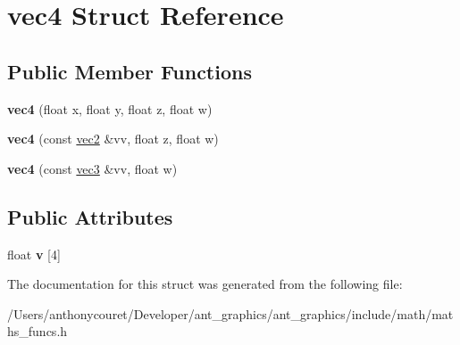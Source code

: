 \hypertarget{structvec4}{\section{vec4 Struct Reference}
\label{structvec4}
}
\subsection*{Public Member Functions}
\begin{DoxyCompactItemize}
\item 
\hypertarget{structvec4_a4174b718621ba5b473ea2c289f11fe46}{{\bfseries vec4} (float x, float y, float z, float w)}\label{structvec4_a4174b718621ba5b473ea2c289f11fe46}

\item 
\hypertarget{structvec4_ab203f1386ef0b79671e9a1324ceee484}{{\bfseries vec4} (const \hyperlink{structvec2}{vec2} \&vv, float z, float w)}\label{structvec4_ab203f1386ef0b79671e9a1324ceee484}

\item 
\hypertarget{structvec4_a8ba17db652f62b23a98cd481390f35da}{{\bfseries vec4} (const \hyperlink{structvec3}{vec3} \&vv, float w)}\label{structvec4_a8ba17db652f62b23a98cd481390f35da}

\end{DoxyCompactItemize}
\subsection*{Public Attributes}
\begin{DoxyCompactItemize}
\item 
\hypertarget{structvec4_a08f56ae363c0cabebd3fe446ef28e652}{float {\bfseries v} \mbox{[}4\mbox{]}}\label{structvec4_a08f56ae363c0cabebd3fe446ef28e652}

\end{DoxyCompactItemize}


The documentation for this struct was generated from the following file\+:\begin{DoxyCompactItemize}
\item 
/\+Users/anthonycouret/\+Developer/ant\+\_\+graphics/ant\+\_\+graphics/include/math/maths\+\_\+funcs.\+h\end{DoxyCompactItemize}
